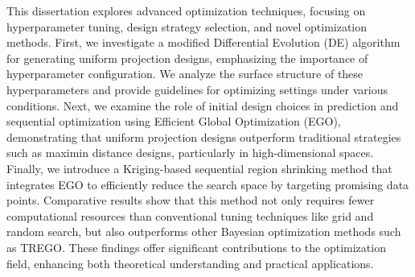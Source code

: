 
This {dissertation} explores advanced optimization techniques, focusing on hyperparameter tuning, design strategy selection, and novel optimization methods. First, we investigate a modified Differential Evolution (DE) algorithm for generating {uniform projection designs}, emphasizing the importance of hyperparameter configuration. We analyze the surface structure of these hyperparameters and provide guidelines for optimizing settings under various conditions. Next, we examine the role of initial design choices in prediction and sequential optimization using Efficient Global Optimization (EGO), demonstrating that uniform projection designs outperform traditional strategies such as maximin distance designs, particularly in high-dimensional spaces. Finally, we introduce a Kriging-based sequential region shrinking method that integrates EGO to efficiently reduce the search space by targeting promising data points. Comparative results show that this method {not only} requires fewer computational resources than conventional tuning techniques like grid and random search, {but also} outperforms other Bayesian optimization methods such as TREGO. These findings offer significant contributions to the optimization field, enhancing both theoretical understanding and practical applications.






